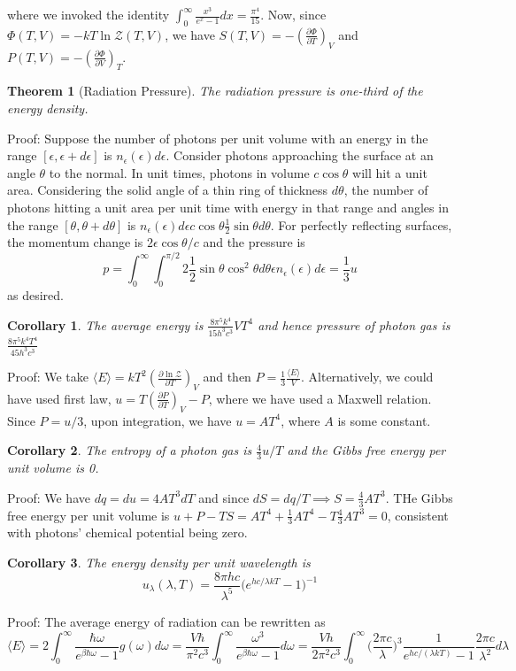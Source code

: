 \documentclass[a4paper]{article}
\newtheorem{thm}{Theorem}[section]
\newtheorem{cor}{Corollary}[section]
\theoremstyle{new}
\begin{document}
where we invoked the identity $\int_0^\infty\frac{x^3}{e^x-1}dx=\frac{\pi^4}{15}$. Now, since $\Phi(T,V)=-kT\ln\mathcal{Z}(T,V)$, we have $S(T,V)=-(\frac{\partial\Phi}{\partial T})_V$ and $P(T,V)=-(\frac{\partial\Phi}{\partial V})_T$.
\begin{thm}[Radiation Pressure]
The radiation pressure is one-third of the energy density.
\end{thm}
Proof: Suppose the number of photons per unit volume with an energy in the range $[\epsilon,\epsilon+d\epsilon]$ is $n_\epsilon(\epsilon)d\epsilon$. Consider photons approaching the surface at an angle $\theta$ to the normal. In unit times, photons in volume $c\cos\theta$ will hit a unit area. Considering the solid angle of a thin ring of thickness $d\theta$, the number of photons hitting a unit area per unit time with energy in that range and angles in the range $[\theta,\theta+d\theta]$ is $n_\epsilon(\epsilon)d\epsilon c\cos\theta\frac{1}{2}\sin\theta d\theta$. For perfectly reflecting surfaces, the momentum change is $2\epsilon\cos\theta/c$ and the pressure is
$$p=\int_0^\infty\int_0^{\pi/2}2\frac{1}{2}\sin\theta\cos^2\theta d\theta\epsilon n_\epsilon(\epsilon)d\epsilon=\frac{1}{3}u$$
as desired.
\begin{cor}
The average energy is $\frac{8\pi^5k^4}{15h^3c^3}VT^4$ and hence pressure of photon gas is $\frac{8\pi^5k^4T^4}{45h^3c^3}$
\end{cor}
Proof: We take
$\langle E\rangle=kT^2(\frac{\partial\ln\mathcal{Z}}{\partial T})_V$ and then $P=\frac{1}{3}\frac{\langle E\rangle}{V}$. Alternatively, we could have used first law, $u=T(\frac{\partial P}{\partial T})_V-P$, where we have used a Maxwell relation. Since $P=u/3$, upon integration, we have $u=AT^4$, where $A$ is some constant. 
\begin{cor}
The entropy of a photon gas is $\frac{4}{3}u/T$ and the Gibbs free energy per unit volume is 0.
\end{cor}
Proof: We have $dq=du=4AT^3dT$ and since $dS=dq/T\implies S=\frac{4}{3}AT^3$. THe Gibbs free energy per unit volume is $u+P-TS=AT^4+\frac{1}{3}AT^4-T\frac{4}{3}AT^3=0$, consistent with photons' chemical potential being zero.
\begin{cor}
The energy density per unit wavelength is
$$u_\lambda(\lambda,T)=\frac{8\pi hc}{\lambda^5}\bigg(e^{hc/\lambda kT}-1\bigg)^{-1}$$
\end{cor}
Proof: The average energy of radiation can be rewritten as
$$\langle E\rangle=2\int_0^\infty\frac{\hbar\omega}{e^{\beta\hbar\omega}-1}g(\omega)d\omega=\frac{V\hbar}{\pi^2c^3}\int_0^\infty\frac{\omega^3}{e^{\beta\hbar\omega}-1}d\omega=\frac{Vh}{2\pi^2c^3}\int_0^\infty\bigg(\frac{2\pi c}{\lambda}\bigg)^3\frac{1}{e^{hc/(\lambda kT)}-1}\frac{2\pi c}{\lambda^2}d\lambda$$
\end{document}
